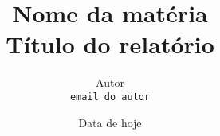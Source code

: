 \title{Nome da matéria \\ \large Título do relatório}

\author{
    Autor\\
    {\color{blue}\texttt{email do autor}}
}

\date{Data de hoje}

\maketitle
